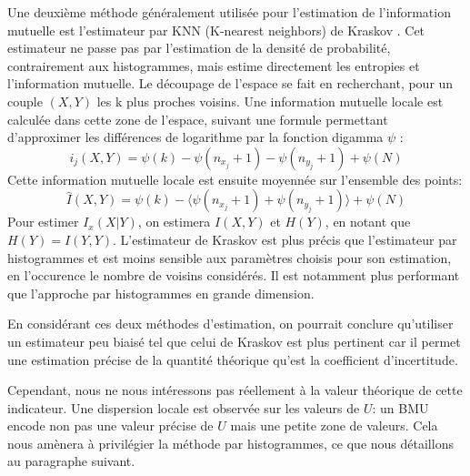 Une deuxième méthode généralement utilisée pour l'estimation de l'information mutuelle est l'estimateur par KNN (K-nearest neighbors) de Kraskov \cite{2004kraskov}. 
Cet estimateur ne passe pas par l'estimation de la densité de probabilité, contrairement aux histogrammes, mais estime directement les entropies et l'information mutuelle.
Le découpage de l'espace se fait en recherchant, pour un couple $(X,Y)$ les k plus proches voisins. Une information mutuelle locale est calculée dans cette zone de l'espace, suivant une formule permettant d'approximer les différences de logarithme par la fonction digamma $\psi$ : 
$$i_j(X,Y) = \psi(k) - \psi(n_{x_j} + 1) - \psi(n_{y_j} +1) + \psi(N)$$
Cette information mutuelle locale est ensuite moyennée sur l'ensemble des points: 
$$\hat{I}(X,Y) = \psi(k) - \langle\psi(n_{x_j} + 1) + \psi(n_{y_j} +1)\rangle + \psi(N)$$
Pour estimer $I_x(X|Y)$, on estimera $I(X,Y)$ et $H(Y)$, en notant que $H(Y) = I(Y,Y)$.
L'estimateur de Kraskov est plus précis que l'estimateur par histogrammes et est moins sensible aux paramètres choisis pour son estimation, en l'occurence le nombre de voisins considérés. Il est notamment plus performant que l'approche par histogrammes en grande dimension.

En considérant ces deux méthodes d'estimation, on pourrait conclure qu'utiliser un estimateur peu biaisé tel que celui de Kraskov est plus pertinent car il permet une estimation précise de la quantité théorique qu'est la coefficient d'incertitude.

Cependant, nous ne nous intéressons pas réellement à la valeur théorique de cette indicateur. Une dispersion locale est observée sur les valeurs de $U$: un BMU encode non pas une valeur précise de $U$ mais une petite zone de valeurs. Cela nous amènera à privilégier la méthode par histogrammes, ce que nous détaillons au paragraphe suivant.

